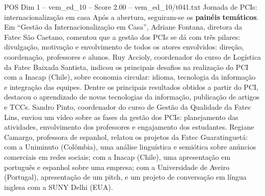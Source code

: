 \begin{textsample}{POS Dim 1 – vem\_ed\_10 – Score 2.00 – vem\_ed\_10/t041.txt}  \label{ex:f1_pos_021}
Jornada de PCIs: internacionalização em casa Após a abertura, seguiram-se os \textbf{painéis} \textbf{temáticos}.
Em “Gestão da Internacionalização em Casa”, Adriane Fontana, diretora da Fatec São Caetano, comentou que a gestão dos PCIs se dá com três pilares: divulgação, motivação e envolvimento de todos os atores envolvidos: direção, coordenação, professores e alunos.
Ruy Accioly, coordenador do curso de Logística da Fatec Baixada Santista, indicou os principais desafios na realização do PCI com a Inacap (Chile), sobre economia circular: idioma, tecnologia da informação e integração das equipes.
Dentre os principais resultados obtidos a partir do PCI, destacou o aprendizado de novas tecnologias da informação, publicação de artigos e TCCs.
Sandro Pinto, coordenador do curso de Gestão da Qualidade da Fatec Lins, enviou um vídeo sobre as fases da gestão dos PCIs: planejamento das atividades, envolvimento dos professores e engajamento dos estudantes.
Regiane Camargo, professora de espanhol, relatou os projetos da Fatec Guaratinguetá: com a Uniminuto (Colômbia), uma análise linguística e semiótica sobre anúncios comerciais em redes sociais; com a Inacap (Chile), uma apresentação em português e espanhol sobre uma empresa; com a Universidade de Aveiro (Portugal), apresentação de um pitch, e um projeto de conversação em língua inglesa com a SUNY Delhi (EUA).

\end{textsample}
